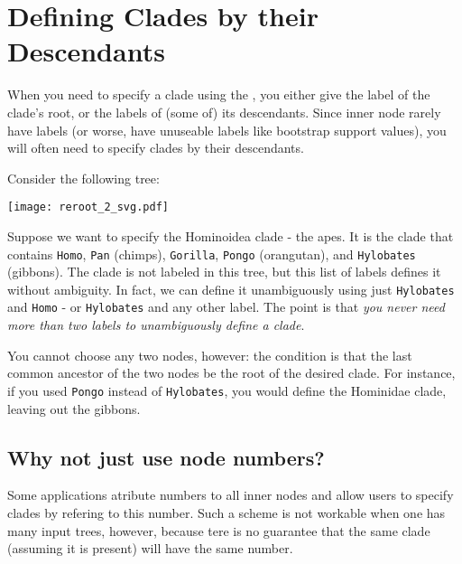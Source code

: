 \chapter{Defining Clades by their Descendants}
\label{sct_def_clades}

When you need to specify a clade using the \nutils{}, you either give the label
of the clade's root, or the labels of (some of) its descendants. Since inner
node rarely have labels (or worse, have unuseable labels like bootstrap support
		values), you will often need to specify clades by their
descendants.

Consider the following tree:

\begin{center}
\texttt{[image: reroot\_2\_svg.pdf]} 
\end{center}

Suppose we want to specify the Hominoidea clade - the apes. It is the clade
that contains \texttt{Homo}, \texttt{Pan} (chimps), \texttt{Gorilla},
\texttt{Pongo} (orangutan), and \texttt{Hylobates} (gibbons). The clade is not
labeled in this tree, but this list of labels defines it without ambiguity. In
fact, we can define it unambiguously using just \texttt{Hylobates} and
\texttt{Homo} - or \texttt{Hylobates} and any other label. The point is that
\emph{you never need more than two labels to unambiguously define a clade}.

You cannot choose any two nodes, however: the condition is that the last
common ancestor of the two nodes be the root of the desired clade. For
instance, if you used \texttt{Pongo} instead of \texttt{Hylobates}, you would
define the Hominidae clade, leaving out the gibbons.

\section{Why not just use node numbers?}

Some applications atribute numbers to all inner nodes and allow users to specify clades by refering to this number. Such a scheme is not workable when one has many input trees, however, because tere is no guarantee that the same clade (assuming it is present) will have the same number.
